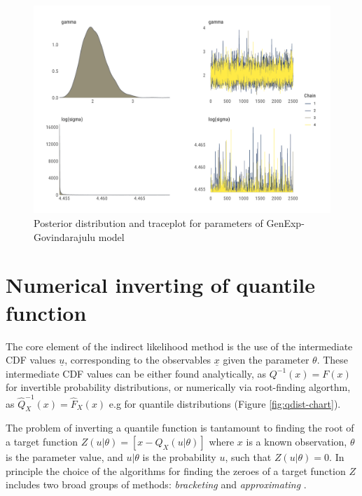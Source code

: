 \documentclass[
  12pt,
]{article}
\begin{document}
\begin{figure}

{\centering \includegraphics[width=0.8\linewidth]{ilbm_article_files/figure-latex/unnamed-chunk-6-1} 

}

\caption{Posterior distribution and traceplot for parameters of GenExp-Govindarajulu model}\label{fig:unnamed-chunk-6}
\end{figure}

\hypertarget{numerical-inverting-of-quantile-function}{%
\section{Numerical inverting of quantile function}\label{numerical-inverting-of-quantile-function}}

The core element of the indirect likelihood method is the use of the intermediate CDF values \(\underline{u}\), corresponding to the observables \(\underline{x}\) given the parameter \(\theta\). These intermediate CDF values can be either found analytically, as \(Q^{-1}(x)=F(x)\) for invertible probability distributions, or numerically via root-finding algorthm, as \(\widehat{Q}^{-1}_X(x)=\widehat{F}_X(x)\) e.g for quantile distributions (Figure \ref{fig:qdist-chart}).

The problem of inverting a quantile function is tantamount to finding the root of a target function \(Z(u|\theta)=[x-Q_X(u|\theta)]\) where \(x\) is a known observation, \(\theta\) is the parameter value, and \(u|\theta\) is the probability \(u\), such that \(Z(u|\theta)=0\). In principle the choice of the algorithms for finding the zeroes of a target function \(Z\) includes two broad groups of methods: \emph{bracketing} and \emph{approximating} \citep{atkinson2008IntroductionNumericalAnalysis, burden2011NumericalAnalysis}.
\end{document}

